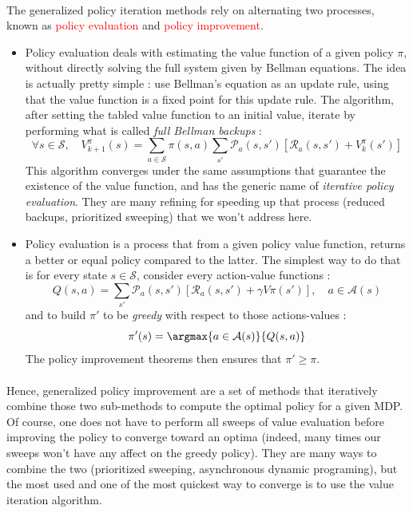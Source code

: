 \documentclass[a4paper]{report}
\begin{document}
{{{				\paragraph{} The generalized policy iteration methods rely on alternating two processes, known as \textcolor{red}{policy evaluation} and \textcolor{red}{policy improvement}. 
				\begin{itemize}[label=$\triangleright$]
					\item Policy evaluation deals with estimating the value function of a given policy $\pi$, without directly solving the full system given by Bellman equations. The idea is actually pretty simple : use Bellman's equation as an update rule, using that the value function is a fixed point for this update rule. The algorithm, after setting the tabled value function to an initial value, iterate by performing what is called \emph{full Bellman backups} : 
					\begin{equation}
						\forall{s}\in\mathcal{S}, \quad V_{k+1}^\pi(s) = \sum_{a\in\mathcal{S}} \pi(s,a)\sum_{s'}\mathcal{P}_a(s,s') \left[\mathcal{R}_a(s,s')+V_k^\pi(s')\right]
					\end{equation}
					This algorithm converges under the same assumptions that guarantee the existence of the value function, and has the generic name of \emph{iterative policy evaluation}. They are many refining for speeding up that process (reduced backups, prioritized sweeping) that we won't address here. 
				\item Policy evaluation is a process that from a given policy value function, returns a better or equal policy compared to the latter. The simplest way to do that is for every state $s\in\mathcal{S}$, consider every action-value functions : 
				\begin{equation}
					Q(s,a) = \sum_{s'}\mathcal{P}_a(s,s')\left[\mathcal{R}_a(s,s') + \gamma V\pi(s')\right], \quad a\in\mathcal{A}(s)
				\end{equation}
				and to build $\pi'$ to be \emph{greedy} with respect to those actions-values : 
				\begin{equation}
					\pi'(s) = \argmax{a\in\mathcal{A}(s)}{Q(s,a)}
				\end{equation}
					The policy improvement theorems then ensures that $\pi'\geq \pi$. 
				\end{itemize}
				
				\paragraph{} Hence, generalized policy improvement are a set of methods that iteratively combine those two sub-methods to compute the optimal policy for a given MDP. Of course, one does not have to perform all sweeps of value evaluation before improving the policy to converge toward an optima (indeed, many times our sweeps won't have any affect on the greedy policy). They are many ways to combine the two (prioritized sweeping, asynchronous dynamic programing), but the most used and one of the most quickest way to converge is to use the value iteration algorithm. 
			}	
}}
\end{document}

